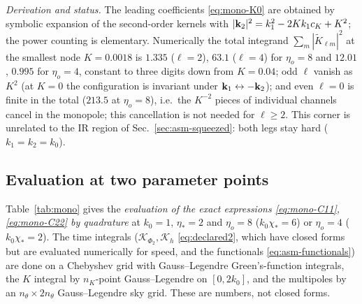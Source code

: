 \noindent\emph{Derivation and status.}  The leading coefficients \eqref{eq:mono-K0} are obtained by symbolic expansion of the second-order kernels with
$|\mathbf k_2|^2=k_1^2-2Kk_1c_K+K^2$; the power counting is elementary.  Numerically
the total integrand $\sum_m|\tilde K_{\ell m}|^2$ at the smallest node $K=0.0018$ is $1.335$ ($\ell=2$), $63.1$ ($\ell=4$) for $\eta_o=8$ and
$12.01$, $0.995$ for $\eta_o=4$, constant to three digits down from $K=0.04$; odd $\ell$ vanish as $K^2$ (at $K=0$ the configuration is
invariant under $\mathbf k_1\leftrightarrow-\mathbf k_2$); and even $\ell=0$ is finite in the total ($213.5$ at $\eta_o=8$), i.e.\ the $K^{-2}$ pieces
of individual channels cancel in the monopole; this cancellation is not needed for $\ell\ge2$.  This corner is unrelated to the IR region of Sec.~\ref{sec:asm-squeezed}: both legs stay hard ($k_1=k_2=k_0$).

\subsection{Evaluation at two parameter points}
\label{sec:mono-num}
Table~\ref{tab:mono} gives the \emph{evaluation of the exact expressions \eqref{eq:mono-C11}, \eqref{eq:mono-C22} by quadrature} at
$k_0=1$, $\eta_*=2$ and $\eta_o=8$ ($k_0\chi_*=6$) or $\eta_o=4$ ($k_0\chi_*=2$).  The time integrals ($\mathcal K_{\Phi_2},\mathcal K_h$
\eqref{eq:declared2}, which have closed forms but are evaluated numerically for speed, and the functionals \eqref{eq:asm-functionals}) are done on a
Chebyshev grid with Gauss--Legendre Green's-function integrals, the $K$ integral by $n_K$-point Gauss--Legendre on $[0,2k_0]$, and the multipoles by an
$n_\theta\times2n_\theta$ Gauss--Legendre sky grid.  These are numbers, not closed forms.


